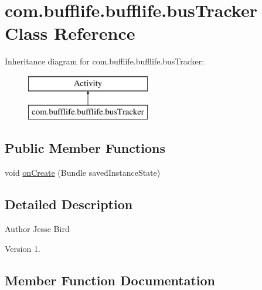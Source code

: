 \hypertarget{classcom_1_1bufflife_1_1bufflife_1_1bus_tracker}{}\section{com.\+bufflife.\+bufflife.\+bus\+Tracker Class Reference}
\label{classcom_1_1bufflife_1_1bufflife_1_1bus_tracker}
Inheritance diagram for com.\+bufflife.\+bufflife.\+bus\+Tracker\+:\begin{figure}[H]
\begin{center}
\leavevmode
\includegraphics[height=2.000000cm]{classcom_1_1bufflife_1_1bufflife_1_1bus_tracker}
\end{center}
\end{figure}
\subsection*{Public Member Functions}
\begin{DoxyCompactItemize}
\item 
void \hyperlink{classcom_1_1bufflife_1_1bufflife_1_1bus_tracker_ac74ed6517a7e560d1c0788ef53e9688f}{on\+Create} (Bundle saved\+Instance\+State)
\end{DoxyCompactItemize}


\subsection{Detailed Description}
\begin{DoxyAuthor}{Author}
Jesse Bird 
\end{DoxyAuthor}
\begin{DoxyVersion}{Version}
1. 
\end{DoxyVersion}


\subsection{Member Function Documentation}
\hypertarget{classcom_1_1bufflife_1_1bufflife_1_1bus_tracker_ac74ed6517a7e560d1c0788ef53e9688f}{}
